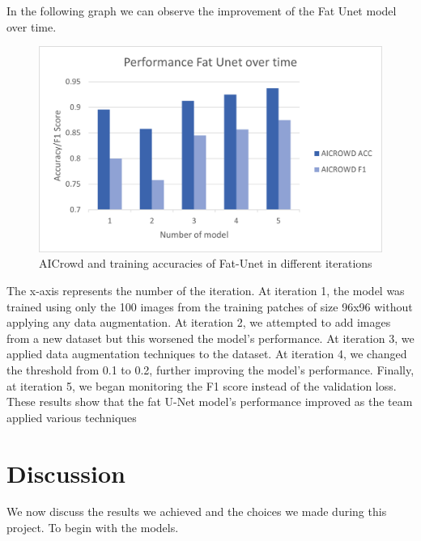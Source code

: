 \documentclass[10pt,conference,compsocconf]{IEEEtran}
\begin{document}
In the following graph we can observe the improvement of the Fat Unet model over time.
\begin{figure}[H]
    \centering
    \includegraphics[scale = 0.5]{report_images/fatunet_progression.png} %
    \caption{AICrowd and training accuracies of Fat-Unet in different iterations}
\end{figure}
The x-axis represents the number of the iteration. At iteration 1, the model was trained using only the 100 images from the training patches of size 96x96 without applying any data augmentation. At iteration 2, we attempted to add images from a new dataset but this worsened the model's performance. At iteration 3, we applied data augmentation techniques to the dataset. At iteration 4, we changed the threshold from 0.1 to 0.2, further improving the model's performance. Finally, at iteration 5, we began monitoring the F1 score instead of the validation loss. These results show that the fat U-Net model's performance improved as the team applied various techniques
\section{Discussion}
We now discuss the results we achieved and the choices we made during this project. To begin with the models. 
\end{document}
